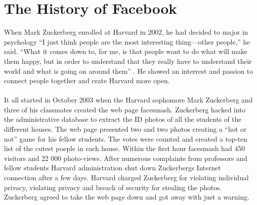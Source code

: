 \section{The History of Facebook}
When Mark Zuckerberg enrolled at Harvard in 2002, he had decided to major in psychology  “I just think people are the most interesting thing—other people,” he said. “What it comes down to, for me, is that people want to do what will make them happy, but in order to understand that they really have to understand their world and what is going on around them” \cite{MeMedia}. He showed an interrest and passion to connect people together and crate Harvard more open. 

\paragraph{}
It all started in October 2003 when the Harvard sophomore Mark Zuckerberg and three of his classmates created the web page facesmash. Zuckerberg hacked into the administrative database to extract the ID photos of all the students of the different houses. The web page presented two and two photos creating a “hot or not” game for his fellow students. The votes were counted and created a top-ten list of the cutest poeple in each house. Within the first hour facesmash had 450 visitors and 22 000 photo-views. After numerous complaints from professors and fellow students Harvard administration shut down Zuckerbergs Internet connection after a few days. Harvard charged Zuckerberg for violating individual privacy, violating privacy and breach of security for stealing the photos. Zuckerberg agreed to take the web page down and got away with just a warning.


